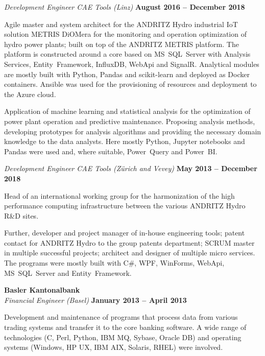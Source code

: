 \documentclass[line,11pt,a4paper]{../resume}
\begin{document}
\begin{resume}
\textsl{Development Engineer CAE Tools (Linz)} \hfill \textbf{August 2016 -- December 2018}\\
\vspace{-4mm}%
\begin{list2}
  \item Agile master and system architect for the ANDRITZ Hydro industrial IoT
    solution METRIS DiOMera for the monitoring and operation optimization of
    hydro power plants; built on top of the ANDRITZ METRIS platform. The
    platform is constructed around a core based on MS~SQL~Server with Analysis
    Services, Entity~Framework, InfluxDB, WebApi and SignalR. Analytical
    modules are mostly built with Python, Pandas and scikit-learn and deployed
    as Docker containers. Ansible was used for the provisioning of resources
    and deployment to the Azure cloud.
  \item Application of machine learning and statistical analysis for the
    optimization of power plant operation and predictive maintenance.
    Proposing analysis methods, developing prototypes for analysis algorithms
    and providing the necessary domain knowledge to the data analysts. Here
    mostly Python, Jupyter notebooks and Pandas were used and, where suitable,
    Power~Query and Power~BI.
\end{list2}

\textsl{Development Engineer CAE Tools (Zürich and Vevey)} \hfill \textbf{May 2013 -- December 2018}\\
\vspace{-4mm}%
\begin{list2}
  \item Head of an international working group for the harmonization of the
    high performance computing infrastructure between the various ANDRITZ Hydro
    R\&D sites.

  \item Further, developer and project manager of in-house engineering tools;
    patent contact for ANDRITZ Hydro to the group patents department; SCRUM
    master in multiple successful projects; architect and designer of multiple
    micro services. The programs were mostly built with C\#, WPF, WinForms,
    WebApi, MS~SQL~Server and Entity~Framework.
\end{list2}

\textbf{Basler Kantonalbank}\\\vspace{1mm}%
\textsl{Financial Engineer (Basel)} \hfill \textbf{January 2013 -- April 2013}\\
\vspace{-4mm}%
\begin{list2}
  \item Development and maintenance of programs that process data from
    various trading systems and transfer it to the core banking software.
    A wide range of technologies (C, Perl, Python, IBM MQ, Sybase, Oracle DB)
    and operating systems (Windows, HP UX, IBM AIX, Solaris, RHEL) were
    involved.
\end{list2}


\end{resume}
\end{document}

